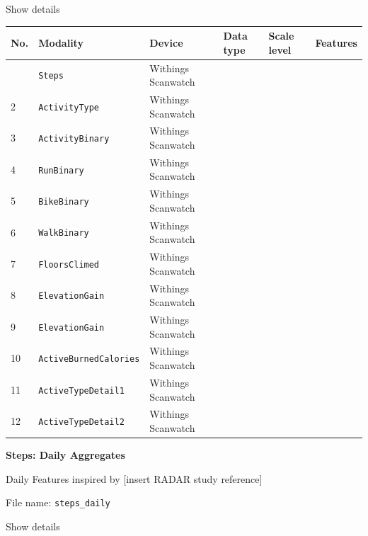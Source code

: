 \documentclass[
  letterpaper,
  DIV=11,
  numbers=noendperiod]{scrartcl}
\begin{document}
Show details

\begin{longtable}[]{@{}llllll@{}}
\toprule\noalign{}
No. & Modality & Device & Data type & Scale level & Features \\
\midrule\noalign{}
\endhead
\bottomrule\noalign{}
\endlastfoot
1 & \texttt{Steps} & Withings Scanwatch & & & \\
2 & \texttt{ActivityType} & Withings Scanwatch & & & \\
3 & \texttt{ActivityBinary} & Withings Scanwatch & & & \\
4 & \texttt{RunBinary} & Withings Scanwatch & & & \\
5 & \texttt{BikeBinary} & Withings Scanwatch & & & \\
6 & \texttt{WalkBinary} & Withings Scanwatch & & & \\
7 & \texttt{FloorsClimed} & Withings Scanwatch & & & \\
8 & \texttt{ElevationGain} & Withings Scanwatch & & & \\
9 & \texttt{ElevationGain} & Withings Scanwatch & & & \\
10 & \texttt{ActiveBurnedCalories} & Withings Scanwatch & & & \\
11 & \texttt{ActiveTypeDetail1} & Withings Scanwatch & & & \\
12 & \texttt{ActiveTypeDetail2} & Withings Scanwatch & & & \\
\end{longtable}

\textbf{Steps: Daily Aggregates}

Daily Features inspired by {[}insert RADAR study reference{]}

File name: \texttt{steps\_daily}

Show details
\end{document}
